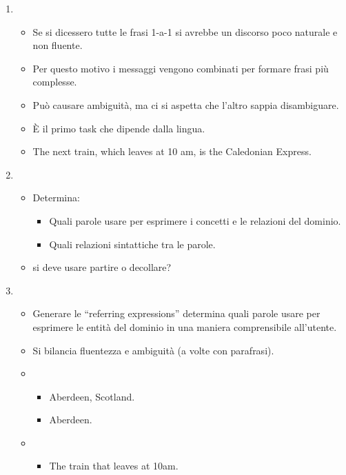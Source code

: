 \begin{enumerate}
\begin{itemize}
    \end{itemize}
  \item {}
    \begin{itemize}
      \item Se si dicessero tutte le frasi 1-a-1 si avrebbe un discorso poco naturale e non fluente. 
      \item Per questo motivo i messaggi vengono combinati per formare frasi più complesse. 
      \item Può causare ambiguità, ma ci si aspetta che l'altro sappia disambiguare.
      \item È il primo task che dipende dalla lingua.
      \item {} The next train, which leaves at 10 am, is the Caledonian Express.
    \end{itemize}
  \item {} 
    \begin{itemize}
      \item Determina: 
        \begin{itemize}
          \item Quali parole usare per esprimere i concetti e le relazioni del dominio. 
          \item Quali relazioni sintattiche tra le parole.
        \end{itemize}
      \item {} si deve usare partire o decollare?
    \end{itemize}
  \item {}
    \begin{itemize}
      \item Generare le “referring expressions” determina quali parole usare per esprimere le entità del dominio in una maniera comprensibile all'utente. 
      \item Si bilancia fluentezza e ambiguità (a volte con parafrasi).
      \item {} 
        \begin{itemize}
          \item Aberdeen, Scotland. 
          \item Aberdeen.
        \end{itemize}
      \item {}
        \begin{itemize}
          \item The train that leaves at 10am. 

\end{itemize}
\end{itemize}
\end{enumerate}
